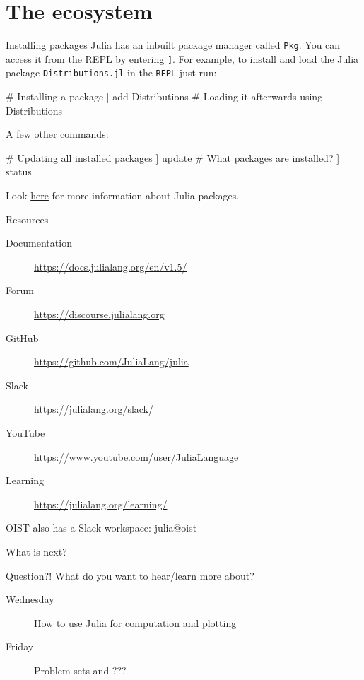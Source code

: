 \documentclass{beamer}
\newenvironment{Boxx}{\begin{tcolorbox}[standard jigsaw, opacityframe=0.8, opacityback=0.0]}{\end{tcolorbox}}
\begin{document}
\section{The ecosystem}
\begin{frame}[fragile]{Installing packages}
  Julia has an inbuilt package manager called \verb|Pkg|. You can access it from the REPL by entering \verb|]|.
  For example, to install and load the Julia package \verb|Distributions.jl| in the \verb|REPL| just run:
\begin{Boxx}
  \begin{jllisting}
  # Installing a package
  ] add Distributions
  # Loading it afterwards
  using Distributions
  \end{jllisting}
\end{Boxx}
  A few other commands:
  \begin{Boxx}
  \begin{jllisting}
  # Updating all installed packages
  ] update
  # What packages are installed?
  ] status
  \end{jllisting}
\end{Boxx}
  Look \href{https://julialang.org/packages/}{\color{blue} here} for more information about Julia packages.
\end{frame}
\begin{frame}{Resources}
\begin{description}
	\item[Documentation] \url{https://docs.julialang.org/en/v1.5/}
	\item[Forum] \url{https://discourse.julialang.org}
	\item[GitHub] \url{https://github.com/JuliaLang/julia}
	\item[Slack] \url{https://julialang.org/slack/}
	\item[YouTube] \url{https://www.youtube.com/user/JuliaLanguage}
	\item[Learning] \url{https://julialang.org/learning/}
\end{description}
\vfill
OIST also has a Slack workspace: julia@oist
\end{frame}
\begin{frame}{What is next?}
  \begin{block}{Question?!}
    What do you want to hear/learn more about?
  \end{block}
  \begin{description}
    \item[Wednesday] How to use Julia for computation and plotting
    \item[Friday] Problem sets and ???
  \end{description}
\end{frame}
\end{document}
